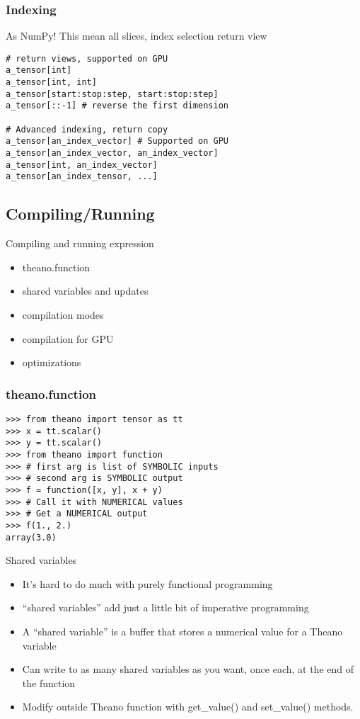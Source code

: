 \documentclass[utf8x,xcolor=pdftex,dvipsnames,table]{beamer}
\begin{document}
\begin{frame}[fragile]
  \frametitle{Indexing}
  As NumPy!
  This mean all slices, index selection return view
\begin{lstlisting}
# return views, supported on GPU
a_tensor[int]
a_tensor[int, int]
a_tensor[start:stop:step, start:stop:step]
a_tensor[::-1] # reverse the first dimension

# Advanced indexing, return copy
a_tensor[an_index_vector] # Supported on GPU
a_tensor[an_index_vector, an_index_vector]
a_tensor[int, an_index_vector]
a_tensor[an_index_tensor, ...]
\end{lstlisting}
\end{frame}

\subsection{Compiling/Running}
\begin{frame}{Compiling and running expression}
  \begin{itemize}
  \item theano.function
  \item shared variables and updates
  \item compilation modes
  \item compilation for GPU
  \item optimizations
  \end{itemize}
\end{frame}

\begin{frame}[fragile]
  \frametitle{theano.function}

\begin{lstlisting}
>>> from theano import tensor as tt
>>> x = tt.scalar()
>>> y = tt.scalar()
>>> from theano import function
>>> # first arg is list of SYMBOLIC inputs
>>> # second arg is SYMBOLIC output
>>> f = function([x, y], x + y)
>>> # Call it with NUMERICAL values
>>> # Get a NUMERICAL output
>>> f(1., 2.)
array(3.0)
\end{lstlisting}
\end{frame}

\begin{frame}{Shared variables}
  \begin{itemize}
  \item It’s hard to do much with purely functional programming
  \item ``shared variables'' add just a little bit of imperative programming
  \item A ``shared variable'' is a buffer that stores a numerical value for a Theano variable
  \item Can write to as many shared variables as you want, once each, at the end of the function
  \item  Modify outside Theano function with get\_value() and set\_value() methods.
  \end{itemize}
\end{frame}
\end{document}
